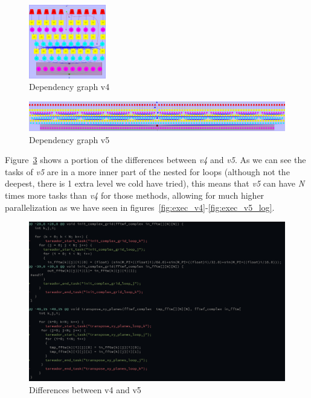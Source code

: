 \begin{figure}[H]%
    \centering
    \includegraphics[width=0.3\textwidth]{data/3dfft_/plots/dependency_graph_v4.pdf.png}
    \caption{Dependency graph v4}%
    \label{fig:depen_v4}
\end{figure}
\begin{figure}[H]%
    \centering
    \includegraphics[width=\textwidth]{data/3dfft_/plots/cap.png}
    \caption{Dependency graph v5}%
    \label{fig:depen_v5}
\end{figure}

Figure~\ref{fig:diff} shows a portion of the differences between \emph{v4} and \emph{v5}. As we can see
the tasks of \emph{v5} are in a more inner part of the nested for loops (although not the deepest, there is 1 extra level we cold have tried), this means that \emph{v5} can have \emph{N} times more tasks than \emph{v4} for those methods, allowing for much higher parallelization as we have seen in figures~\ref{fig:exec_v4}-\ref{fig:exec_v5_log}.

\begin{figure}[H]%
    \centering
    \includegraphics[width=\textwidth]{./data/3dfft_/plots/diff.png}
    \caption{Differences between v4 and v5}%
    \label{fig:diff}
\end{figure}

